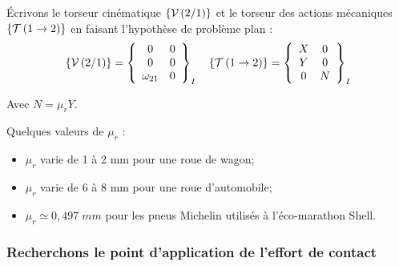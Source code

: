 \documentclass[10pt]{article}
\begin{document}
Écrivons le torseur cinématique $\torseurcin{V}{2}{1}$ et le torseur des actions mécaniques $\torseurstat{T}{1}{2}$ en faisant l'hypothèse de problème plan :
$$
\torseurcin{V}{2}{1} 
=\torseurcol{0}{0}{\omega_{21}}{0}{0}{0}{I}
\quad 
\torseurstat{T}{1}{2} 
=\torseurcol{X}{Y}{0}{0}{0}{N}{I}
$$

Avec $N = \mu_r Y$. 

\begin{rem}
Quelques valeurs de $\mu_r$ :
\begin{itemize}
\item $\mu_r$ varie de 1 à 2 mm pour une roue de wagon;
\item $\mu_r$ varie de 6 à 8 mm pour une roue d'automobile;
\item $\mu_r \simeq 0,497 \; mm$ pour les pneus Michelin utilisés à l'éco-marathon Shell.
\end{itemize}
\end{rem}

\subsubsection{Recherchons le point d'application de l'effort de contact}
\end{document}
